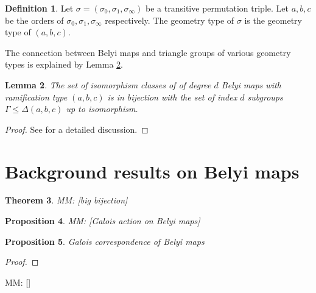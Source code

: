 \documentclass{dcthesis}
\newcommand{\defi}[1]{\textsf{#1}}
\newcommand{\mm}[1]{{\color{blue} \sf MM: [#1]}}
\newtheorem{prop}{Proposition}[section]
\newtheorem{theorem}[prop]{Theorem}
\newtheorem{lemma}[prop]{Lemma}
\theoremstyle{definition}
\newtheorem{definition}[prop]{Definition}
\theoremstyle{remark}
\numberwithin{equation}{section}
\numberwithin{figure}{section}
\begin{document}
{{\begin{definition}
      Let $\sigma=(\sigma_0,\sigma_1,\sigma_\infty)$ be a transitive permutation triple.
      Let $a,b,c$ be the orders of
      $\sigma_0,\sigma_1,\sigma_\infty$ respectively.
      The \defi{geometry type} of $\sigma$
      is the geometry type of $(a,b,c)$.
    \end{definition}
    The connection between Belyi maps and triangle groups
    of various geometry types is explained by Lemma
    \ref{lem:belyimapsandtrianglegroups}.
    \begin{lemma}
      \label{lem:belyimapsandtrianglegroups}
      The set of isomorphism classes of of degree $d$
      Belyi maps with ramification type $(a,b,c)$
      is in bijection with the set of
      index $d$ subgroups
      $\Gamma\leq\Delta(a,b,c)$
      up to isomorphism.
    \end{lemma}
    \begin{proof}
      See \cite{KMSV} for a detailed discussion.
    \end{proof}
  }
  \section{Background results on Belyi maps}{\label{sec:backgroundresults}
    \begin{theorem}\label{thm:bigbijection}
      \mm{big bijection}
    \end{theorem}
    \begin{prop}\label{prop:galoisaction}
      \mm{Galois action on Belyi maps}
    \end{prop}
    \begin{prop}\label{prop:galoiscorrespondence}
      Galois correspondence of Belyi maps
    \end{prop}
    \begin{proof}
    \end{proof}
    \mm{\cite[1.6, 1.7]{SV}}
  }
}
\end{document}
